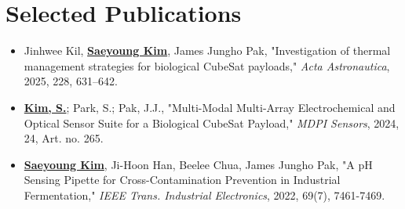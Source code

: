 \documentclass[letterpaper,11pt]{moderncv}
\begin{document}

\section{Selected Publications}
\begin{sloppypar}
\begin{itemize}[leftmargin=1cm, itemsep=0pt, parsep=0pt]
    \item Jinhwee Kil, \textbf{\underline{Saeyoung Kim}}, James Jungho Pak, "Investigation of thermal management strategies for biological CubeSat payloads," \textit{Acta Astronautica}, 2025, 228, 631--642.
    \item \textbf{\underline{Kim, S.}}; Park, S.; Pak, J.J., "Multi-Modal Multi-Array Electrochemical and Optical Sensor Suite for a Biological CubeSat Payload," \textit{MDPI Sensors}, 2024, 24, Art. no. 265.
    \item \textbf{\underline{Saeyoung Kim}}, Ji-Hoon Han, Beelee Chua, James Jungho Pak, "A pH Sensing Pipette for Cross-Contamination Prevention in Industrial Fermentation," \textit{IEEE Trans. Industrial Electronics}, 2022, 69(7), 7461-7469.
\end{itemize}
\end{sloppypar}

\vfill
{}
\end{document}
